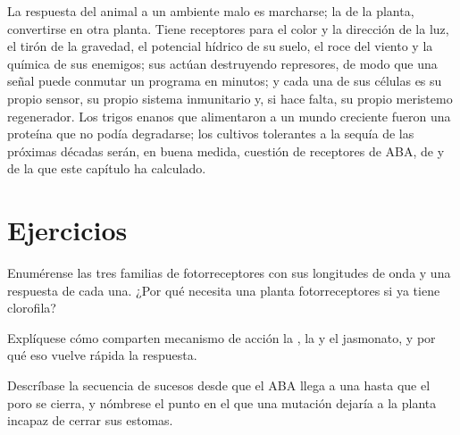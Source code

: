 \begin{remark}\label{rem:b3:plant-molecular-physiology:remark}
La respuesta del animal a un ambiente malo es marcharse; la de la
planta, convertirse en otra planta. Tiene receptores para el color y la
dirección de la luz, el tirón de la gravedad, el potencial hídrico de
su suelo, el roce del viento y la química de sus enemigos; sus 
actúan destruyendo represores, de modo que una señal puede conmutar un
programa en minutos; y cada una de sus células es su propio sensor, su
propio sistema inmunitario y, si hace falta, su propio meristemo
regenerador. Los trigos enanos que alimentaron a un mundo creciente
fueron una proteína  que no podía degradarse; los cultivos
tolerantes a la sequía de las próximas décadas serán, en buena medida,
cuestión de receptores de ABA, de  y de la
 que este capítulo ha calculado.
\end{remark}

\section{Ejercicios}

\begin{exercise}[$\star$]\label{exo:b3:plant-molecular-physiology:1}
Enumérense las tres familias de fotorreceptores con sus longitudes de
onda y una respuesta de cada una. ¿Por qué necesita una planta
fotorreceptores si ya tiene clorofila?
\end{exercise}

\begin{exercise}[$\star$]\label{exo:b3:plant-molecular-physiology:2}
Explíquese cómo comparten mecanismo de acción la , la 
y el jasmonato, y por qué eso vuelve rápida la respuesta.
\end{exercise}

\begin{exercise}[$\star$]\label{exo:b3:plant-molecular-physiology:3}
Descríbase la secuencia de sucesos desde que el ABA llega a una  hasta que el poro se cierra, y nómbrese el punto en el que una
mutación dejaría a la planta incapaz de cerrar sus estomas.
\end{exercise}

